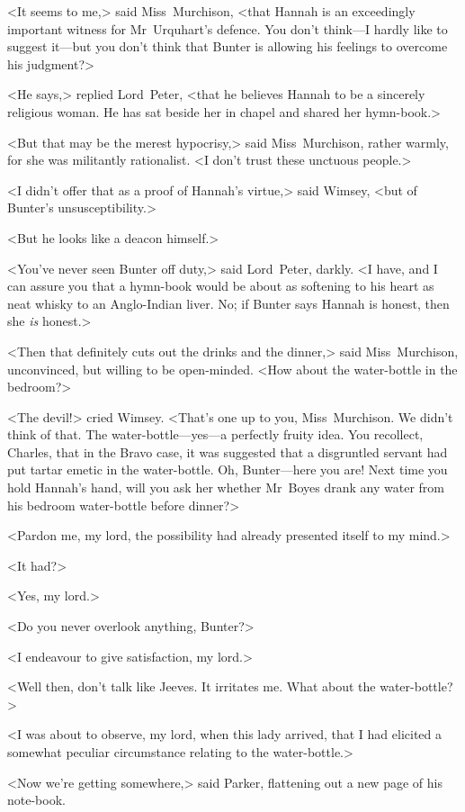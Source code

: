 <It seems to me,> said Miss~Murchison, <that Hannah is an exceedingly important witness for Mr~Urquhart's defence. You don't think—I hardly like to suggest it—but you don't think that Bunter is allowing his feelings to overcome his judgment?>

<He says,> replied Lord~Peter, <that he believes Hannah to be a sincerely religious woman. He has sat beside her in chapel and shared her hymn-book.>

<But that may be the merest hypocrisy,> said Miss~Murchison, rather warmly, for she was militantly rationalist. <I don't trust these unctuous people.>

<I didn't offer that as a proof of Hannah's virtue,> said Wimsey, <but of Bunter's unsusceptibility.>

<But he looks like a deacon himself.>

<You've never seen Bunter off duty,> said Lord~Peter, darkly. <I have, and I can assure you that a hymn-book would be about as softening to his heart as neat whisky to an Anglo-Indian liver. No; if Bunter says Hannah is honest, then she \emph{is} honest.>

<Then that definitely cuts out the drinks and the dinner,> said Miss~Murchison, unconvinced, but willing to be open-minded. <How about the water-bottle in the bedroom?>

<The devil!> cried Wimsey. <That's one up to you, Miss~Murchison. We didn't think of that. The water-bottle—yes—a perfectly fruity idea. You recollect, Charles, that in the Bravo case, it was suggested that a disgruntled servant had put tartar emetic in the water-bottle. Oh, Bunter—here you are! Next time you hold Hannah's hand, will you ask her whether Mr~Boyes drank any water from his bedroom water-bottle before dinner?>

<Pardon me, my lord, the possibility had already presented itself to my mind.>

<It had?>

<Yes, my lord.>

<Do you never overlook anything, Bunter?>

<I endeavour to give satisfaction, my lord.>

<Well then, don't talk like Jeeves. It irritates me. What about the water-bottle?>

<I was about to observe, my lord, when this lady arrived, that I had elicited a somewhat peculiar circumstance relating to the water-bottle.>

<Now we're getting somewhere,> said Parker, flattening out a new page of his note-book.

